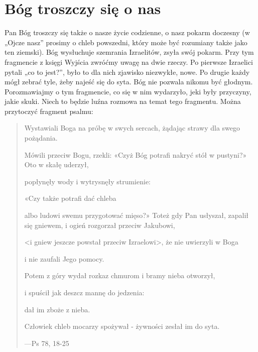 \documentclass[a5paper,10pt,polish]{book}
\begin{document}
\section{Bóg troszczy się o nas}
\label{babice2006-jesien-knurow/spotkanie2:bog-troszczy-sie-o-nas}
Pan Bóg troszczy się także o nasze życie codzienne, o nasz pokarm doczesny (w „Ojcze nasz” prosimy o chleb powszedni, który może być rozumiany także jako ten ziemski). Bóg wysłuchuje szemrania Izraelitów, zsyła swój pokarm. Przy tym fragmencie z księgi Wyjścia zwróćmy uwagę na dwie rzeczy. Po pierwsze Izraelici pytali „co to jest?”, było to dla nich zjawisko niezwykłe, nowe. Po drugie każdy mógł zebrać tyle, żeby najeść się do syta. Bóg nie pozwala nikomu być głodnym. Porozmawiajmy o tym fragmencie, co się w nim wydarzyło, jeki były przyczyny, jakie skuki. Niech to będzie luźna rozmowa na temat tego fragmentu. Można przytoczyć fragment psalmu:
\begin{quote}

\begin{DUlineblock}{0em}
\item[] Wystawiali Boga na próbę w swych sercach, żądając strawy dla swego pożądania.
\item[] Mówili przeciw Bogu, rzekli: «Czyż Bóg potrafi nakryć stół w pustyni?» Oto w skałę uderzył,
\item[] popłynęły wody i wytrysnęły strumienie:
\item[] «Czy także potrafi dać chleba
\item[] albo ludowi swemu przygotować mięso?» Toteż gdy Pan usłyszał, zapalił się gniewem, i ogień rozgorzał przeciw Jakubowi,
\item[] \textless{}i gniew jeszcze powstał przeciw Izraelowi\textgreater{}, że nie uwierzyli w Boga
\item[] i nie zaufali Jego pomocy.
\item[] Potem z góry wydał rozkaz chmurom i bramy nieba otworzył,
\item[] i spuścił jak deszcz mannę do jedzenia:
\item[] dał im zboże z nieba.
\item[] Człowiek chleb mocarzy spożywał - żywności zesłał im do syta.
\end{DUlineblock}

\begin{flushright}
---Ps 78, 18-25
\end{flushright}
\end{quote}
\end{document}
